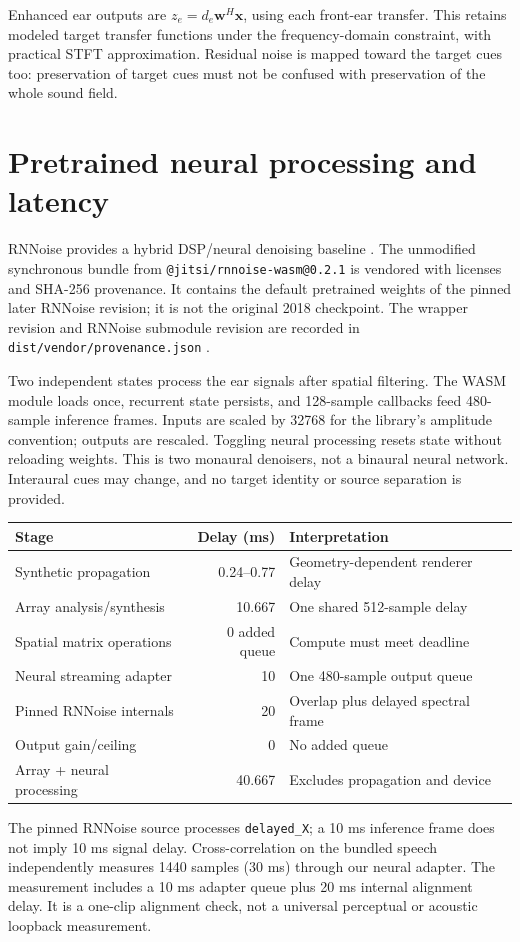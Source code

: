 \documentclass[11pt,a4paper]{article}
\begin{document}
Enhanced ear outputs are $z_e=d_e\mathbf w^H\mathbf x$, using each front-ear transfer. This retains modeled target transfer functions under the frequency-domain constraint, with practical STFT approximation. Residual noise is mapped toward the target cues too: preservation of target cues must not be confused with preservation of the whole sound field.

\newpage
\section{Pretrained neural processing and latency}
RNNoise provides a hybrid DSP/neural denoising baseline \cite{valin}. The unmodified synchronous bundle from \texttt{@jitsi/rnnoise-wasm@0.2.1} is vendored with licenses and SHA-256 provenance. It contains the default pretrained weights of the pinned later RNNoise revision; it is not the original 2018 checkpoint. The wrapper revision and RNNoise submodule revision are recorded in \texttt{dist/vendor/provenance.json} \cite{jitsi,xiph}.

Two independent states process the ear signals after spatial filtering. The WASM module loads once, recurrent state persists, and 128-sample callbacks feed 480-sample inference frames. Inputs are scaled by 32768 for the library's amplitude convention; outputs are rescaled. Toggling neural processing resets state without reloading weights. This is two monaural denoisers, not a binaural neural network. Interaural cues may change, and no target identity or source separation is provided.

\begin{center}\begin{tabularx}{\linewidth}{@{}l r Y@{}}\toprule
Stage & Delay (ms) & Interpretation\\\midrule
Synthetic propagation & 0.24--0.77 & Geometry-dependent renderer delay\\
Array analysis/synthesis & 10.667 & One shared 512-sample delay\\
Spatial matrix operations & 0 added queue & Compute must meet deadline\\
Neural streaming adapter & 10 & One 480-sample output queue\\
Pinned RNNoise internals & 20 & Overlap plus delayed spectral frame\\
Output gain/ceiling & 0 & No added queue\\\midrule
Array + neural processing & 40.667 & Excludes propagation and device\\\bottomrule
\end{tabularx}\end{center}
The pinned RNNoise source processes \texttt{delayed\_X}; a 10 ms inference frame does not imply 10 ms signal delay. Cross-correlation on the bundled speech independently measures 1440 samples (30 ms) through our neural adapter. The measurement includes a 10 ms adapter queue plus 20 ms internal alignment delay. It is a one-clip alignment check, not a universal perceptual or acoustic loopback measurement.
\end{document}
